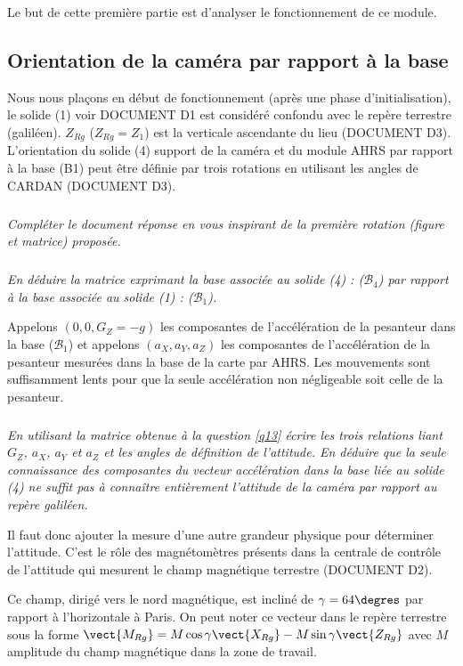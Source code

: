 \documentclass[10pt,fleqn]{article} %
\begin{document}
Le but de cette première partie est d’analyser le fonctionnement de ce module. 

\subsection{Orientation de la caméra par rapport à la base}
Nous nous plaçons en début de fonctionnement (après une phase d’initialisation), le solide (1) voir DOCUMENT D1 est considéré confondu avec le repère terrestre (galiléen). $Z_{Rg}$ ($Z_{Rg}=Z_1$) est la verticale ascendante du lieu (DOCUMENT D3). L’orientation du solide (4) support de la caméra et du module AHRS par rapport à la base (B1) peut être définie par trois rotations en utilisant les angles de CARDAN  (DOCUMENT D3).

\subparagraph{\label{q12}}\textit{Compléter le document réponse en vous inspirant de la première rotation (figure et matrice) proposée.}

\subparagraph{\label{q13}}\textit{En déduire la matrice exprimant la base associée au solide (4) : ($\mathcal{B}_4$) par rapport à la base associée au solide (1) : ($\mathcal{B}_1$).}
 
Appelons $(0, 0, G_Z = -g)$ les composantes de l’accélération de la pesanteur dans la base ($\mathcal{B}_1$) et appelons $(a_X, a_Y, a_Z)$ les composantes de l’accélération de la pesanteur mesurées dans la base de la carte par AHRS. Les mouvements sont suffisamment lents pour que la seule accélération non négligeable soit celle de la pesanteur.

\subparagraph{\label{q14}}\textit{En utilisant la matrice obtenue à la question \ref{q13} écrire les trois relations liant $G_Z$, $a_X$, $a_Y$ et $a_Z$ et les angles de définition de l’attitude. En déduire que la seule connaissance des composantes du vecteur accélération dans la base liée au solide (4) ne suffit pas à connaître entièrement l’attitude de la caméra par rapport au repère galiléen.}

Il faut donc ajouter la mesure d’une autre grandeur physique pour déterminer l’attitude. C’est le rôle des magnétomètres présents dans la centrale de contrôle de l’attitude qui mesurent le champ magnétique terrestre (DOCUMENT D2). 

Ce champ, dirigé vers le nord magnétique, est incliné de $\gamma=64\degres$ par rapport à l’horizontale à Paris.
On peut noter ce vecteur dans le repère terrestre sous la forme $\vect{M_{Rg}}=M\cos\gamma \vect{X_{Rg}}-M\sin\gamma \vect{Z_{Rg}}$ avec $M$ amplitude du champ magnétique dans la zone de travail. 
\end{document}

